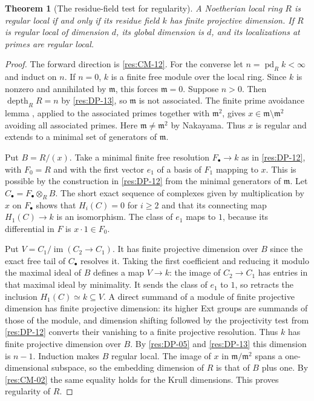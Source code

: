 \documentclass[11pt,oneside,openany]{book}
\newtheorem{theorem}{Theorem}[chapter]
\theoremstyle{definition}
\theoremstyle{remark}
\begin{document}
\begin{theorem}[The residue-field test for regularity]
\label{res:CM-19}
A Noetherian local ring $R$ is regular local if and only
if its residue field $k$ has finite projective dimension.
If $R$ is regular local of dimension $d$, its global
dimension is $d$, and its localizations at primes are
regular local.
\end{theorem}
\begin{proof}
The forward direction is \ref{res:CM-12}. For the converse
let $n=\operatorname{pd}_R k<\infty$ and induct on $n$.
If $n=0$, $k$ is a finite free module over the local ring.
Since $k$ is nonzero and annihilated by $\mathfrak m$, this
forces $\mathfrak m=0$. Suppose $n>0$.
Then $\operatorname{depth}_R R=n$ by \ref{res:DP-13},
so $\mathfrak m$ is not associated. The finite prime
avoidance lemma \cite[ALG-05-C02-S01]{p103}, applied
to the associated primes together with $\mathfrak m^2$,
gives $x\in\mathfrak m\setminus\mathfrak m^2$ avoiding
all associated primes. Here $\mathfrak m\ne\mathfrak m^2$
by Nakayama. Thus $x$ is regular and extends to a minimal
set of generators of $\mathfrak m$.

Put $B=R/(x)$. Take a minimal finite free resolution
$F_\bullet\to k$ as in \ref{res:DP-12}, with $F_0=R$
and with the first vector $e_1$ of a basis of $F_1$
mapping to $x$. This is possible by the construction in
\ref{res:DP-12} from the minimal generators of $\mathfrak m$.
Let $C_\bullet=F_\bullet\otimes_R B$. The short exact
sequence of complexes given by multiplication by $x$
on $F_\bullet$ shows that $H_i(C)=0$ for $i\ge2$ and
that its connecting map $H_1(C)\to k$ is an isomorphism.
The class of $e_1$ maps to $1$, because its differential
in $F$ is $x\cdot1\in F_0$.

Put $V=C_1/\operatorname{im}(C_2\to C_1)$. It has finite
projective dimension over $B$ since the exact free tail of
$C_\bullet$ resolves it. Taking the first coefficient and
reducing it modulo the maximal ideal of $B$ defines
a map $V\to k$: the image of $C_2\to C_1$ has entries
in that maximal ideal by minimality. It sends the class
of $e_1$ to $1$, so retracts the inclusion $H_1(C)\simeq
k\subseteq V$. A direct summand of a module of finite
projective dimension has finite projective dimension:
its higher Ext groups are summands of those of the module,
and dimension shifting followed by the projectivity test
from \ref{res:DP-12} converts their vanishing to a finite
projective resolution. Thus $k$ has finite projective
dimension over $B$. By \ref{res:DP-05} and \ref{res:DP-13}
this dimension is $n-1$. Induction makes $B$ regular
local. The image of $x$ in $\mathfrak m/\mathfrak m^2$
spans a one-dimensional subspace, so the embedding
dimension of $R$ is that of $B$ plus one. By \ref{res:CM-02}
the same equality holds for the Krull dimensions.
This proves regularity of $R$.


\end{proof}
\end{document}
